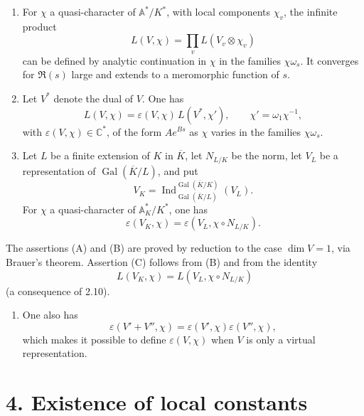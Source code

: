 \documentclass[10pt,letterpaper]{article}
\newcommand{\C}{\mathbb C}
\newcommand{\Gal}{\operatorname{Gal}}
\newcommand{\Ind}{\operatorname{Ind}}
\providecommand{\Gal}{\operatorname{Gal}}
\providecommand{\Gal}{\operatorname{Gal}}
\providecommand{\Gal}{\operatorname{Gal}}
\providecommand{\Gal}{\operatorname{Gal}}
\providecommand{\Ind}{\operatorname{Ind}}
\begin{document}
\begin{enumerate}[label=(\Alph*)]
\item For \(\chi\) a quasi-character of \(\mathbb A^*/K^*\), with local components \(\chi_v\), the infinite product
\[
L(V,\chi)=\prod_vL(V_v\otimes\chi_v)
\]
can be defined by analytic continuation in \(\chi\) in the families \(\chi\omega_s\). It converges for \(\Re(s)\) large and extends to a meromorphic function of \(s\).

\item Let \(V^*\) denote the dual of \(V\). One has
\[
L(V,\chi)=\varepsilon(V,\chi)\,L(V^*,\chi'),
\qquad \chi'=\omega_1\chi^{-1},
\]
with \(\varepsilon(V,\chi)\in\C^*\), of the form \(Ae^{Bs}\) as \(\chi\) varies in the families \(\chi\omega_s\).

\item Let \(L\) be a finite extension of \(K\) in \(\overline K\), let \(N_{L/K}\) be the norm, let \(V_L\) be a representation of \(\Gal(\overline K/L)\), and put
\[
V_K=\Ind_{\Gal(\overline K/L)}^{\Gal(\overline K/K)}(V_L).
\]
For \(\chi\) a quasi-character of \(\mathbb A_K^*/K^*\), one has
\[
\varepsilon(V_K,\chi)=\varepsilon(V_L,\chi\circ N_{L/K}).
\]
\end{enumerate}
The assertions (A) and (B) are proved by reduction to the case \(\dim V=1\), via Brauer's theorem. Assertion (C) follows from (B) and from the identity
\[
L(V_K,\chi)=L(V_L,\chi\circ N_{L/K})
\]
(a consequence of 2.10).

\begin{enumerate}[label=(\Alph*),start=4]
\item One also has
\[
\varepsilon(V'+V'',\chi)=\varepsilon(V',\chi)\varepsilon(V'',\chi),
\]
which makes it possible to define \(\varepsilon(V,\chi)\) when \(V\) is only a virtual representation.
\end{enumerate}



\section*{4. Existence of local constants}
\end{document}
